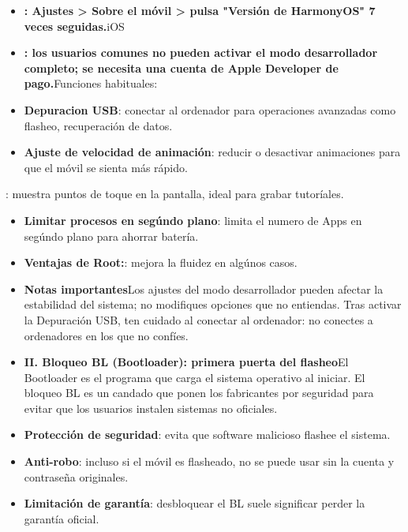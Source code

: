 
\begin{itemize}
  \item \textbf{: Ajustes > Sobre el móvil > pulsa "Versión de HarmonyOS" 7 veces seguidas.}iOS
  \item \textbf{: los usuarios comunes no pueden activar el modo desarrollador completo; se necesita una cuenta de Apple Developer de pago.}Funciones habituales:
  \item \textbf{Depuracion USB}: conectar al ordenador para operaciones avanzadas como flasheo, recuperación de datos.
  \item \textbf{Ajuste de velocidad de animación}: reducir o desactivar animaciones para que el móvil se sienta más rápido.
\end{itemize}


: muestra puntos de toque en la pantalla, ideal para grabar tutoríales.

\begin{itemize}
  \item \textbf{Limitar procesos en segúndo plano}: limita el numero de Apps en segúndo plano para ahorrar batería.
  \item \textbf{Ventajas de Root:}: mejora la fluidez en algúnos casos.
  \item \textbf{Notas importantes}Los ajustes del modo desarrollador pueden afectar la estabilidad del sistema; no modifiques opciones que no entiendas. Tras activar la Depuración USB, ten cuidado al conectar al ordenador: no conectes a ordenadores en los que no confíes.
  \item \textbf{II. Bloqueo BL (Bootloader): primera puerta del flasheo}El Bootloader es el programa que carga el sistema operativo al iniciar. El bloqueo BL es un candado que ponen los fabricantes por seguridad para evitar que los usuarios instalen sistemas no oficiales.
\end{itemize}


\begin{itemize}
  \item \textbf{Protección de seguridad}: evita que software malicioso flashee el sistema.
  \item \textbf{Anti-robo}: incluso si el móvil es flasheado, no se puede usar sin la cuenta y contraseña originales.
  \item \textbf{Limitación de garantía}: desbloquear el BL suele significar perder la garantía oficial.
\end{itemize}

